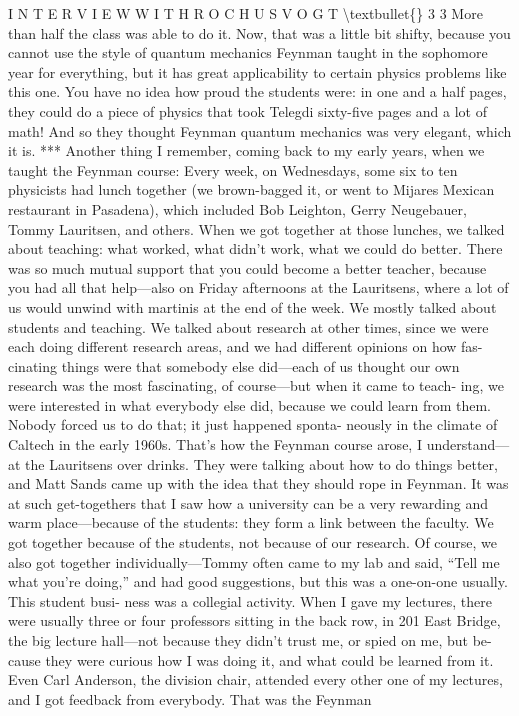\documentclass[10pt,oneside]{article}
\begin{document}
I N T E R V I E W  W I T H  R O C H U S  V O G T \textbackslash{}textbullet\{\} 3 3 More than half the class was able to do it. Now, that was a little bit shifty, because you cannot use the style of quantum mechanics Feynman taught in the sophomore year for everything, but it has great applicability to certain physics problems like this one. You have no idea how proud the students were: in one and a half pages, they could do a piece of physics that took Telegdi sixty-five pages and a lot of math! And so they thought Feynman quantum mechanics was very elegant, which it is. *** Another thing I remember, coming back to my early years, when we taught the Feynman course: Every week, on Wednesdays, some six to ten physicists had lunch together (we brown-bagged it, or went to Mijares Mexican restaurant in Pasadena), which included Bob Leighton, Gerry Neugebauer, Tommy Lauritsen, and others. When we got together at those lunches, we talked about teaching: what worked, what didn’t work, what we could do better. There was so much mutual support that you could become a better teacher, because you had all that help---also on Friday afternoons at the Lauritsens, where a lot of us would unwind with martinis at the end of the week. We mostly talked about students and teaching. We talked about research at other times, since we were each doing different research areas, and we had different opinions on how fas- cinating things were that somebody else did---each of us thought our own research was the most fascinating, of course---but when it came to teach- ing, we were interested in what everybody else did, because we could learn from them. Nobody forced us to do that; it just happened sponta- neously in the climate of Caltech in the early 1960s. That’s how the Feynman course arose, I understand---at the Lauritsens over drinks. They were talking about how to do things better, and Matt Sands came up with the idea that they should rope in Feynman. It was at such get-togethers that I saw how a university can be a very rewarding and warm place---because of the students: they form a link between the faculty. We got together because of the students, not because of our research. Of course, we also got together individually---Tommy often came to my lab and said, “Tell me what you’re doing,” and had good suggestions, but this was a one-on-one usually. This student busi- ness was a collegial activity. When I gave my lectures, there were usually three or four professors sitting in the back row, in 201 East Bridge, the big lecture hall---not because they didn’t trust me, or spied on me, but be- cause they were curious how I was doing it, and what could be learned from it. Even Carl Anderson, the division chair, attended every other one of my lectures, and I got feedback from everybody. That was the Feynman\par
\end{document}
